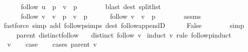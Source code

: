 \begin{isabellebody}
\ \ \ \ \ \ {\isachardoublequoteopen}follow\ u\ {\isacharequal}{\kern0pt}\ p\ {\isacharat}{\kern0pt}\ v\ {\isacharhash}{\kern0pt}\ p{\isacharprime}{\kern0pt}{\isachardoublequoteclose}\isanewline
\ \ \ \ \ \ \isamarkupfalse%
\ {\isacharparenleft}{\kern0pt}blast\ dest{\isacharcolon}{\kern0pt}\ split{\isacharunderscore}{\kern0pt}list{\isacharparenright}{\kern0pt}\isanewline
\ \ \ \ \isamarkupfalse%
\isanewline
\ \ \ \ \ \ {\isachardoublequoteopen}follow\ v\ {\isacharequal}{\kern0pt}\ v\ {\isacharhash}{\kern0pt}\ {\isacharparenleft}{\kern0pt}p\ {\isacharat}{\kern0pt}\ v\ {\isacharhash}{\kern0pt}\ p{\isacharprime}{\kern0pt}{\isacharparenright}{\kern0pt}{\isachardoublequoteclose}\isanewline
\ \ \ \ \ \ {\isachardoublequoteopen}follow\ v\ {\isacharequal}{\kern0pt}\ v\ {\isacharhash}{\kern0pt}\ p{\isacharprime}{\kern0pt}{\isachardoublequoteclose}\isanewline
\ \ \ \ \ \ \isamarkupfalse%
\ assms\isanewline
\ \ \ \ \ \ \isamarkupfalse%
\ {\isacharparenleft}{\kern0pt}fastforce\ simp\ add{\isacharcolon}{\kern0pt}\ follow{\isacharunderscore}{\kern0pt}psimps\ dest{\isacharcolon}{\kern0pt}\ follow{\isacharunderscore}{\kern0pt}appendD{\isacharparenright}{\kern0pt}{\isacharplus}{\kern0pt}\isanewline
\ \ \ \ \isamarkupfalse%
\ False\isanewline
\ \ \ \ \ \ \isamarkupfalse%
\ simp\isanewline
\ \ \isamarkupfalse%
\isanewline
{}\isamarkupfalse%
%
\endisatagproof
{\isafoldproof}%
%
\isadelimproof
\isanewline
%
\endisadelimproof
%
\isadeliminvisible
\isanewline
%
\endisadeliminvisible
%
\isataginvisible
{}\isamarkupfalse%
\ {\isacharparenleft}{\kern0pt}\ parent{\isacharparenright}{\kern0pt}\ distinct{\isacharunderscore}{\kern0pt}follow{\isacharcolon}{\kern0pt}\isanewline
\ \ \ {\isachardoublequoteopen}distinct\ {\isacharparenleft}{\kern0pt}follow\ v{\isacharparenright}{\kern0pt}{\isachardoublequoteclose}%
\endisataginvisible
{\isafoldinvisible}%
%
\isadeliminvisible
\isanewline
%
\endisadeliminvisible
%
\isadelimproof
%
\endisadelimproof
%
\isatagproof
{}\isamarkupfalse%
\ {\isacharparenleft}{\kern0pt}induct\ v\ rule{\isacharcolon}{\kern0pt}\ follow{\isacharunderscore}{\kern0pt}pinduct{\isacharparenright}{\kern0pt}\isanewline
\ \ \isamarkupfalse%
\ {\isacharparenleft}{\kern0pt}{}\ v{\isacharparenright}{\kern0pt}\isanewline
\ \ \isamarkupfalse%
\ {\isacharquery}{\kern0pt}case\isanewline
\ \ \isamarkupfalse%
\ {\isacharparenleft}{\kern0pt}cases\ {\isachardoublequoteopen}parent\ v{\isachardoublequoteclose}{\isacharparenright}{\kern0pt}\isanewline

\end{isabellebody}
